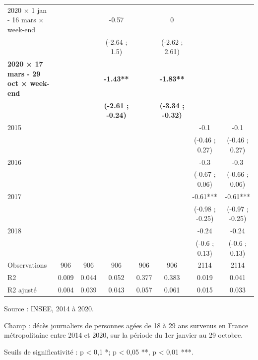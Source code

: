 \documentclass[titlepage]{article}
\begin{document}
\begin{landscape}
\begin{table}[H]
{\begin{threeparttable}
\begin{tabular}[t]{lccccccc}
2020 × 1 jan - 16 mars × week-end &  &  & -0.57 &  & 0 &  & \\
 &  &  & (-2.64 ; 1.5) &  & (-2.62 ; 2.61) &  & \\
\textbf{2020 × 17 mars - 29 oct × week-end} & \textbf{} & \textbf{} & \textbf{-1.43**} & \textbf{} & \textbf{-1.83**} & \textbf{} & \textbf{}\\
\textbf{} & \textbf{} & \textbf{} & \textbf{(-2.61 ; -0.24)} & \textbf{} & \textbf{(-3.34 ; -0.32)} & \textbf{} & \textbf{}\\
2015 &  &  &  &  &  & -0.1 & -0.1\\
 &  &  &  &  &  & (-0.46 ; 0.27) & (-0.46 ; 0.27)\\
2016 &  &  &  &  &  & -0.3 & -0.3\\
 &  &  &  &  &  & (-0.67 ; 0.06) & (-0.66 ; 0.06)\\
2017 &  &  &  &  &  & -0.61*** & -0.61***\\
 &  &  &  &  &  & (-0.98 ; -0.25) & (-0.97 ; -0.25)\\
2018 &  &  &  &  &  & -0.24 & -0.24\\
 &  &  &  &  &  & (-0.6 ; 0.13) & (-0.6 ; 0.13)\\
Observations & 906 & 906 & 906 & 906 & 906 & 2114 & 2114\\
R2 & 0.009 & 0.044 & 0.052 & 0.377 & 0.383 & 0.019 & 0.041\\
R2 ajusté & 0.004 & 0.039 & 0.043 & 0.057 & 0.061 & 0.015 & 0.033\\
\bottomrule
\end{tabular}
\begin{tablenotes}
\item Source : INSEE, 2014 à 2020.
\item Champ : décès journaliers de personnes agées de 18 à 29 ans survenus en France métropolitaine entre 2014 et 2020, sur la période du 1er janvier au 29 octobre.
\item Seuils de significativité : p < 0,1 *; p < 0,05 **, p < 0,01 ***.
\end{tablenotes}
\end{threeparttable}}
\end{table}\end{landscape}

\end{document}
